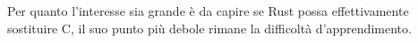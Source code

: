 \documentclass[Lau,binding=0.6cm]{sapthesis}
\begin{document}
Per quanto l'interesse sia grande è da capire se Rust possa effettivamente sostituire C, il suo punto più debole rimane la difficoltà d'apprendimento.


\backmatter

\cleardoublepage
{}
{}
\end{document}
